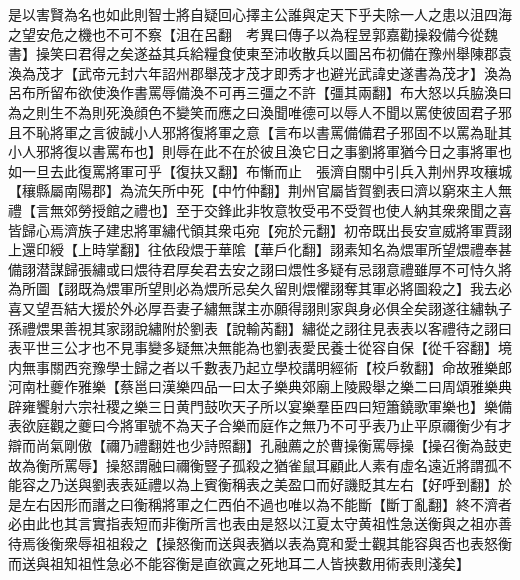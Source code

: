 是以害賢為名也如此則智士將自疑回心擇主公誰與定天下乎夫除一人之患以沮四海之望安危之機也不可不察【沮在呂翻　考異曰傳子以為程昱郭嘉勸操殺備今從魏書】操笑曰君得之矣遂益其兵給糧食使東至沛收散兵以圖呂布初備在豫州舉陳郡袁渙為茂才【武帝元封六年詔州郡舉茂才茂才即秀才也避光武諱史遂書為茂才】渙為呂布所留布欲使渙作書罵辱備渙不可再三彊之不許【彊其兩翻】布大怒以兵脇渙曰為之則生不為則死渙顔色不變笑而應之曰渙聞唯德可以辱人不聞以罵使彼固君子邪且不恥將軍之言彼誠小人邪將復將軍之意【言布以書罵備備君子邪固不以罵為耻其小人邪將復以書罵布也】則辱在此不在於彼且渙它日之事劉將軍猶今日之事將軍也如一旦去此復罵將軍可乎【復扶又翻】布慚而止　張濟自關中引兵入荆州界攻穰城【穰縣屬南陽郡】為流矢所中死【中竹仲翻】荆州官屬皆賀劉表曰濟以窮來主人無禮【言無郊勞授館之禮也】至于交鋒此非牧意牧受弔不受賀也使人納其衆衆聞之喜皆歸心焉濟族子建忠將軍繡代領其衆屯宛【宛於元翻】初帝既出長安宣威將軍賈詡上還印綬【上時掌翻】往依段煨于華隂【華戶化翻】詡素知名為煨軍所望煨禮奉甚備詡潜謀歸張繡或曰煨待君厚矣君去安之詡曰煨性多疑有忌詡意禮雖厚不可恃久將為所圖【詡既為煨軍所望則必為煨所忌矣久留則煨懼詡奪其軍必將圖殺之】我去必喜又望吾結大援於外必厚吾妻子繡無謀主亦願得詡則家與身必俱全矣詡遂往繡執子孫禮煨果善視其家詡說繡附於劉表【說輸芮翻】繡從之詡往見表表以客禮待之詡曰表平世三公才也不見事變多疑無决無能為也劉表愛民養士從容自保【從千容翻】境内無事關西兖豫學士歸之者以千數表乃起立學校講明經術【校戶敎翻】命故雅樂郎河南杜夔作雅樂【蔡邕曰漢樂四品一曰太子樂典郊廟上陵殿舉之樂二曰周頌雅樂典辟雍饗射六宗社稷之樂三日黄門鼓吹天子所以宴樂羣臣四曰短簫鐃歌軍樂也】樂備表欲庭觀之夔曰今將軍號不為天子合樂而庭作之無乃不可乎表乃止平原禰衡少有才辯而尚氣剛傲【禰乃禮翻姓也少詩照翻】孔融薦之於曹操衡罵辱操【操召衡為鼓吏故為衡所罵辱】操怒謂融曰禰衡豎子孤殺之猶雀鼠耳顧此人素有虛名遠近將謂孤不能容之乃送與劉表表延禮以為上賓衡稱表之美盈口而好譏貶其左右【好呼到翻】於是左右因形而譖之曰衡稱將軍之仁西伯不過也唯以為不能斷【斷丁亂翻】終不濟者必由此也其言實指表短而非衡所言也表由是怒以江夏太守黄祖性急送衡與之祖亦善待焉後衡衆辱祖祖殺之【操怒衡而送與表猶以表為寛和愛士觀其能容與否也表怒衡而送與祖知祖性急必不能容衡是直欲寘之死地耳二人皆挾數用術表則淺矣】

